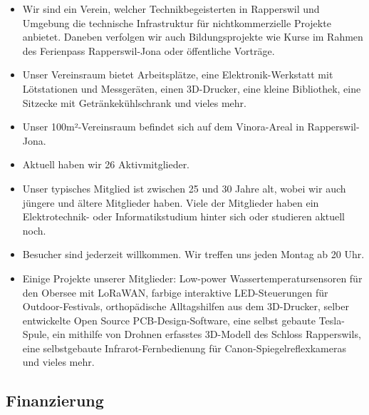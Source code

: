 \documentclass[10pt,a4paper,parskip,fleqn]{scrartcl}
\newcommand{\membercount}{26}
\begin{document}
\begin{itemize}
	\item Wir sind ein Verein, welcher Technikbegeisterten in Rapperswil und
		Umgebung die technische Infrastruktur für nichtkommerzielle Projekte
		anbietet. Daneben verfolgen wir auch Bildungsprojekte wie Kurse im Rahmen
		des Ferienpass Rapperswil-Jona oder öffentliche Vorträge.
	\item Unser Vereinsraum bietet Arbeitsplätze, eine Elektronik-Werkstatt mit
		Lötstationen und Messgeräten, einen 3D-Drucker, eine kleine Bibliothek, eine
		Sitzecke mit Getränkekühlschrank und vieles mehr.
	\item Unser 100m²-Vereinsraum befindet sich auf dem Vinora-Areal in
		Rapperswil-Jona.
	\item Aktuell haben wir \membercount{} Aktivmitglieder.
	\item Unser typisches Mitglied ist zwischen 25 und 30 Jahre alt, wobei wir
		auch jüngere und ältere Mitglieder haben. Viele der Mitglieder haben ein
		Elektrotechnik- oder Informatikstudium hinter sich oder studieren aktuell
		noch.
	\item Besucher sind jederzeit willkommen. Wir treffen uns jeden Montag ab 20
		Uhr.
	\item Einige Projekte unserer Mitglieder: Low-power Wassertemperatursensoren
		für den Obersee mit LoRaWAN, farbige interaktive LED-Steuerungen für
		Outdoor-Festivals, orthopädische Alltagshilfen aus dem 3D-Drucker, selber
		entwickelte Open Source PCB-Design-Software, eine selbst gebaute
		Tesla-Spule, ein mithilfe von Drohnen erfasstes 3D-Modell des Schloss
		Rapperswils, eine selbstgebaute Infrarot-Fernbedienung für
		Canon-Spiegelreflexkameras und vieles mehr.
\end{itemize}

\subsection{Finanzierung}
\end{document}

